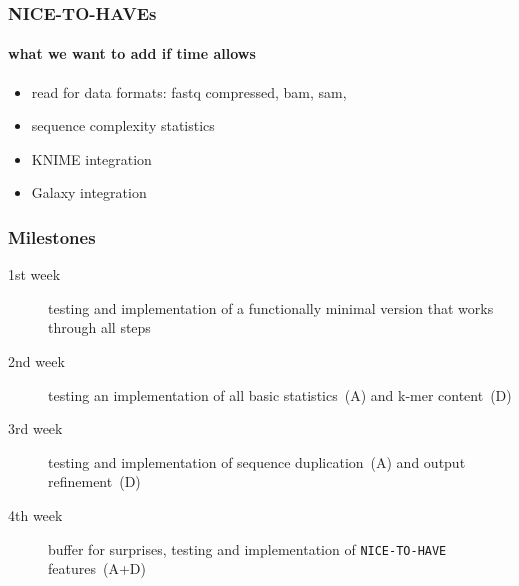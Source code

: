 \documentclass{beamer}
\begin{document}
\begin{frame}
 \frametitle{NICE-TO-HAVEs}
 \framesubtitle{what we want to add if time allows}
\begin{itemize}
 \item read for data formats: fastq compressed, bam, sam, 
 \item sequence complexity statistics
 \item KNIME integration
 \item Galaxy integration
\end{itemize}

\end{frame}


\begin{frame}
 \frametitle{ Milestones }
 \begin{description}
  \item [1st week] testing and implementation of a functionally minimal version that works through all steps
  \item [2nd week] testing an implementation of all basic statistics~(A) and k-mer content~(D)
  \item [3rd week] testing and implementation of sequence duplication~(A) and output refinement~(D)
  \item [4th week] buffer for surprises, testing and implementation of \texttt{NICE-TO-HAVE} features~(A+D) 
 \end{description}
 
\end{frame}
\end{document}
